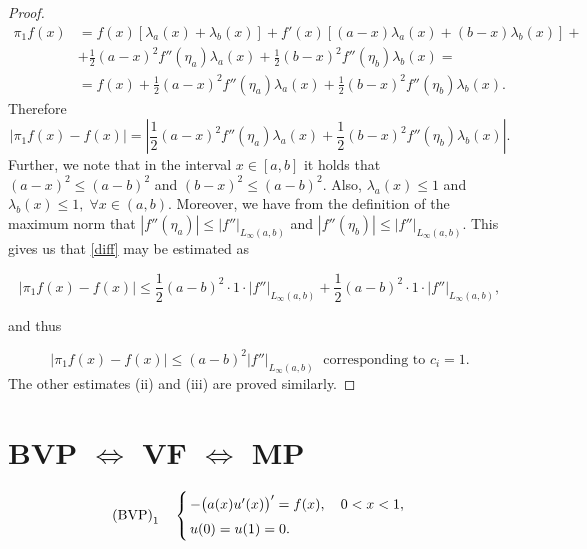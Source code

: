 \documentclass[12pt, a4paper]{article}
\numberwithin{equation}{section}
\begin{document}
\begin{proof}
\begin{equation*}
\begin{split}
\pi_1 f(x) &= f(x)[\lambda_a(x)+\lambda_b(x)] + f'(x)[(a-x)\lambda_a(x) + (b-x)\lambda_b(x)]+ \\
&+ \frac{1}{2}(a-x)^2 f''(\eta_a)\lambda_a(x)+\frac{1}{2}(b-x)^2 f''(\eta_b)\lambda_b(x)=\\
&=f(x)+\frac{1}{2}(a-x)^2f''(\eta_a)\lambda_a(x) + \frac{1}{2}(b-x)^2f''(\eta_b)\lambda_b(x).
\end{split}
\end{equation*}
Therefore
\begin{equation}
\label{diff}
|\pi_1f(x)-f(x)| = \left|\frac{1}{2}(a-x)^2f''(\eta_a)\lambda_a(x)+\frac{1}{2}(b-x)^2f''(\eta_b)\lambda_b(x)\right|.
\end{equation}
Further, we note that in the interval $x\in[a,b]$ it holds that $(a-x)^2 \leq (a-b)^2$ and $(b-x)^2\leq (a-b)^2$. Also, $\lambda_a(x)\leq 1$ and $\lambda_b(x) \leq 1, \; \forall x\in(a,b)$. Moreover, we have from the definition of the maximum norm that $|f''(\eta_a)| \leq |f''|_{L_\infty (a,b)}$ and $|f''(\eta_b)| \leq |f''|_{L_\infty (a,b)}$. This gives us that \eqref{diff} may be estimated as

\begin{equation}
|\pi_1f(x)-f(x)| \leq \frac{1}{2}(a-b)^2\cdot 1 \cdot |f''|_{L_\infty (a,b)} + \frac{1}{2}(a-b)^2\cdot 1 \cdot |f''|_{L_\infty (a,b)},
\end{equation}

and thus

\begin{equation*}
|\pi_1f(x) - f(x)|\leq (a-b)^2|f''|_{L_\infty (a,b)}\; \text{ corresponding to } c_i = 1.
\end{equation*}
The other estimates (ii) and (iii) are proved similarly.
\end{proof}

\section{BVP $\Leftrightarrow$ VF $\Leftrightarrow$ MP}
\begin{equation}
\label{bvp}
\arraycolsep=1.5pt\def\arraystretch{1.5}
\text{(BVP)}_1 \quad \left\{ \begin{array}{l}

-\big(a(x)u'(x)\big)' = f(x), \quad 0<x<1,\\
u(0)=u(1)=0.

\end{array}\right.
\end{equation}
\end{document}
